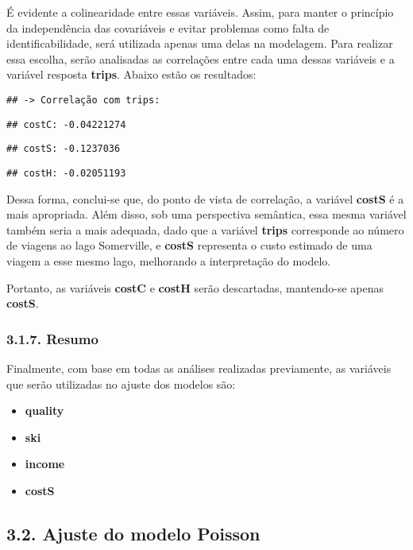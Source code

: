 \documentclass[
]{article}
\providecommand{\tightlist}{%
  \setlength{\itemsep}{0pt}\setlength{\parskip}{0pt}}
\begin{document}
É evidente a colinearidade entre essas variáveis. Assim, para manter o
princípio da independência das covariáveis e evitar problemas como falta
de identificabilidade, será utilizada apenas uma delas na modelagem.
Para realizar essa escolha, serão analisadas as correlações entre cada
uma dessas variáveis e a variável resposta \textbf{trips}. Abaixo estão
os resultados:

\begin{verbatim}
## -> Correlação com trips:
\end{verbatim}

\begin{verbatim}
## costC: -0.04221274
\end{verbatim}

\begin{verbatim}
## costS: -0.1237036
\end{verbatim}

\begin{verbatim}
## costH: -0.02051193
\end{verbatim}

Dessa forma, conclui-se que, do ponto de vista de correlação, a variável
\textbf{costS} é a mais apropriada. Além disso, sob uma perspectiva
semântica, essa mesma variável também seria a mais adequada, dado que a
variável \textbf{trips} corresponde ao número de viagens ao lago
Somerville, e \textbf{costS} representa o custo estimado de uma viagem a
esse mesmo lago, melhorando a interpretação do modelo.

Portanto, as variáveis \textbf{costC} e \textbf{costH} serão
descartadas, mantendo-se apenas \textbf{costS}.

\subsubsection{3.1.7. Resumo}\label{resumo}

Finalmente, com base em todas as análises realizadas previamente, as
variáveis que serão utilizadas no ajuste dos modelos são:

\begin{itemize}
\tightlist
\item
  \textbf{quality}
\item
  \textbf{ski}
\item
  \textbf{income}
\item
  \textbf{costS}
\end{itemize}

\subsection{3.2. Ajuste do modelo
Poisson}\label{ajuste-do-modelo-poisson}
\end{document}
